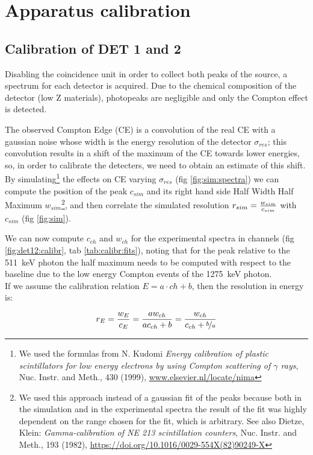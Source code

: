 \documentclass[11pt,a4 paper]{article}
\let\oldfrac\frac
\renewcommand{\frac}[3][d]{\ifthenelse{\equal{#1}{d}}{\oldfrac{#2}{#3}}{\nicefrac{#2}{#3}}}
\begin{document}
\section{Apparatus calibration}

\subsection{Calibration of DET 1 and 2}
Disabling the coincidence unit in order to collect both peaks of the  source, a spectrum for each detector is acquired. Due to the chemical composition of the detector (low Z materials), photopeaks are negligible and only the Compton effect is detected.

The observed Compton Edge (CE) is a convolution of the real CE with a gaussian noise whose width is the energy resolution of the detector $\sigma_{res}$; this convolution results in a shift of the maximum of the CE towards lower energies, so, in order to calibrate the detecters, we need to obtain an estimate of this shift.
By simulating\footnote{We used the formulas from N. Kudomi \emph{Energy calibration of plastic scintillators for low energy electrons by using Compton scattering of $\gamma$ rays}, Nuc. Instr. and Meth., 430 (1999), \url{www.elsevier.nl/locate/nima}} the effects on CE varying $\sigma_{res}$ (fig \ref{fig:sim:spectra}) we can compute the position of the peak $c_{sim}$ and its right hand side Half Width Half Maximum $w_{sim}$\footnote{We used this approach instead of a gaussian fit of the peaks because both in the simulation and in the experimental spectra the result of the fit was highly dependent on the range chosen for the fit, which is arbitrary. See also Dietze, Klein: \emph{Gamma-calibration of NE 213 scintillation counters}, Nuc. Instr. and Meth., 193 (1982), \url{https://doi.org/10.1016/0029-554X(82)90249-X}},
and  then correlate the simulated resolution $r_{sim} = \frac{w_{sim}}{c_{sim}}$ with $c_{sim}$ (fig \ref{fig:sim}).

We can now compute $c_{ch}$ and $w_{ch}$ for the experimental spectra in channels (fig \ref{fig:det12:calibr}, tab \ref{tab:calibr:fits}), noting that for the peak relative to the \SI{511}{\kilo\electronvolt} photon the half maximum needs to be computed with respect to the baseline due to the low energy Compton events of the \SI{1275}{\kilo\electronvolt} photon.\\
If we assume the calibration relation $E = a \cdot ch + b$, then the resolution in energy is:

\begin{equation*}
  r_E = \frac{w_E}{c_E} = \frac{a w_{ch}}{a c_{ch} + b} = \frac{w_{ch}}{c_{ch} + \frac[f]{b}{a}}
\end{equation*}
\end{document}
